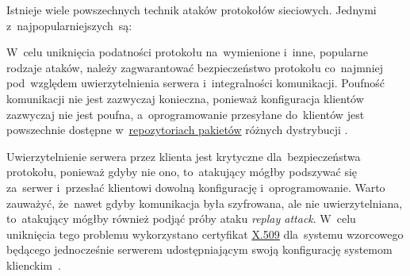 \documentclass[thesis]{subfiles}
\begin{document}
Istnieje wiele powszechnych technik ataków protokołów sieciowych. Jednymi z~najpopularniejszych~są:\mynobreakpar


W~celu uniknięcia podatności protokołu na~wymienione i~inne, popularne rodzaje ataków, należy zagwarantować bezpieczeństwo protokołu co~najmniej pod~względem uwierzytelnienia serwera i~integralności komunikacji. Poufność komunikacji nie jest zazwyczaj konieczna, ponieważ konfiguracja klientów zazwyczaj nie jest poufna, a~oprogramowanie przesyłane do~klientów jest powszechnie dostępne w~\href{https://wiki.archlinux.org/index.php/official_repositories}{repozytoriach pakietów} różnych dystrybucji . %

Uwierzytelnienie serwera przez klienta jest krytyczne dla~bezpieczeństwa protokołu, ponieważ gdyby nie ono, to~atakujący mógłby podszywać się za~serwer i~przesłać klientowi dowolną konfigurację i~oprogramowanie. Warto zauważyć, że~nawet gdyby komunikacja była szyfrowana, ale nie uwierzytelniana, to~atakujący mógłby również podjąć próby ataku \emph{replay attack}. W~celu uniknięcia tego problemu wykorzystano certyfikat \href{https://en.wikipedia.org/wiki/X.509}{X.509} dla~systemu wzorcowego będącego jednocześnie serwerem udostępniającym swoją konfigurację systemom klienckim~\cite{wiki:x509}.
\end{document}
